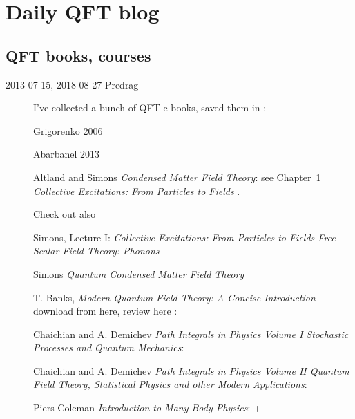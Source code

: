 
\chapter{Daily QFT blog}
\label{c-QFTblog}

\section{QFT books, courses}
\label{s-QFTbooks}

\begin{description}

\item[2013-07-15, 2018-08-27 Predrag]
I've collected a bunch of QFT e-books, saved
them in :

Grigorenko 2006 

Abarbanel 2013 

Altland and Simons
{\em Condensed Matter Field Theory}:
see Chapter~1 {\em Collective Excitations: From
Particles to Fields} .

Check out also

 {Simons},
Lecture I:
{\em Collective Excitations:  From Particles to Fields
Free Scalar Field Theory:  Phonons}

Simons
{\em Quantum Condensed Matter Field Theory}

T. Banks,
{\em Modern Quantum Field Theory: A Concise Introduction}
download from
 {here},
review  {here} :\\

Chaichian and A. Demichev
{\em Path Integrals in Physics
Volume I
Stochastic Processes and Quantum Mechanics}:

Chaichian and A. Demichev
{\em Path Integrals in Physics
Volume  II
Quantum Field Theory, Statistical Physics and other Modern Applications}:

{Piers Coleman} {\em Introduction to Many-Body Physics}:
 + 


\end{description}
